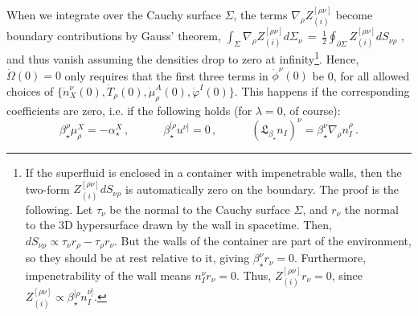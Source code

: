 \documentclass[a4paper, amsfonts, amssymb, amsmath, reprint, showkeys, nofootinbib, twoside,notitlepage,onecolumn]{revtex4-2}
\newcommand{\spc}{\quad \quad \quad}
\theoremstyle{definition}
\theoremstyle{theorem}
\theoremstyle{corollary}
\begin{document}
When we integrate over the Cauchy surface $\Sigma$, the terms $\nabla_\rho {Z}_{(i)}^{[\rho \nu]}$ become boundary contributions by Gauss' theorem, $\int_\Sigma \! \nabla_\rho Z_{(i)}^{[\rho \nu]} d\Sigma_\nu\,{=}\,\frac{1}{2}\oint_{\partial \Sigma}\! Z_{(i)}^{[\rho \nu]}dS_{\nu \rho}$ \cite[\S 3.3.3]{PoissonToolkit2009pwt}, and thus vanish assuming the densities drop to zero at infinity\footnote{If the superfluid is enclosed in a container with impenetrable walls, then the two-form $Z_{(i)}^{[\rho \nu]}dS_{\nu \rho}$ is automatically zero on the boundary. The proof is the following. Let $\tau_\nu$ be the normal to the Cauchy surface $\Sigma$, and $r_\nu$ the normal to the 3D hypersurface drawn by the wall in spacetime. Then, $dS_{\nu \rho}\propto \tau_\nu r_\rho-\tau_\rho r_\nu  $. But the walls of the container are part of the environment, so they should be at rest relative to it, giving $\beta_\star^\nu r_\nu=0$. Furthermore, impenetrability of the wall means $n_I^\nu r_\nu=0$. Thus, $Z_{(i)}^{[\rho \nu]}r_\nu =0$, since $Z_{(i)}^{[\rho \nu]} \propto \beta^{[\rho}_\star n^{\nu]}_I$.}. Hence, $\dot{\Omega}(0)=0$ only requires that the first three terms in $\dot{\phi}^\nu (0)$ be 0, for all allowed choices of $\{\dot{n}_X^\nu(0),\dot{T}_\rho (0),\dot{\mu}^A_\rho(0),\dot{\varphi}^I(0)\}$. {\color{black}This happens if the corresponding coefficients are zero, i.e. if the following holds (for $\lambda=0$, of course):
\begin{equation}\label{equillo}
\boxed{\beta_\star^\rho \mu^X_\rho=-\alpha_\star^X \, ,} \spc \boxed{\beta^{[\rho}_\star u^{\nu]}=0 \, ,} \spc  \boxed{(\mathfrak{L}_{\beta_\star} n_I)^\nu =\beta_\star^\nu \nabla_\rho n_I^\rho \, . }
\end{equation}
}
\end{document}
